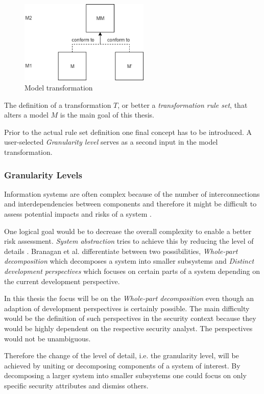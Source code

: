 \begin{figure}[H]
\centering
\includegraphics[width=0.55\textwidth]{pictures/transformation.png}
\caption{Model transformation}
\label{fig:transformation}
\end{figure}

The definition of a transformation $T$, or better a \textit{transformation rule set}, that alters a model $M$ is the main goal of this thesis.

Prior to the actual rule set definition one final concept has to be introduced. A user-selected \textit{Granularity level} serves as a second input in the model transformation.

\subsubsection{Granularity Levels}

Information systems are often complex because of the number of interconnections and interdependencies between components and therefore it might be difficult to assess potential impacts and risks of a system \cite{branagan}.

One logical goal would be to decrease the overall complexity to enable a better risk assessment. \textit{System abstraction} tries to achieve this by reducing the level of details \cite{branagan}. Branagan et al. differentiate between two possibilities, \textit{Whole-part decomposition} which decomposes a system into smaller subsystems and \textit{Distinct development perspectives} which focuses on certain parts of a system depending on the current development perspective. 

In this thesis the focus will be on the \textit{Whole-part decomposition} even though an adaption of development perspectives is certainly possible. The main difficulty would be the definition of such perspectives in the security context because they would be highly dependent on the respective security analyst. The perspectives would not be unambiguous.
  
Therefore the change of the level of detail, i.e. the granularity level, will be achieved by uniting or decomposing components of a system of interest. By decomposing a larger system into smaller subsystems one could focus on only specific security attributes and dismiss others.

